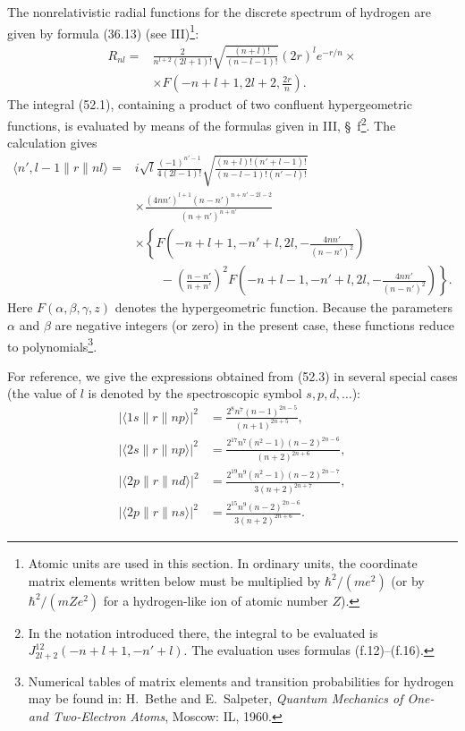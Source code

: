 The nonrelativistic radial functions for the discrete spectrum of hydrogen are given by formula (36.13) (see III)\footnote{Atomic units are used in this section. In ordinary units, the coordinate matrix elements written below must be multiplied by $\hbar^2/(me^2)$ (or by $\hbar^2/(mZe^2)$ for a hydrogen-like ion of atomic number $Z$).}:
\begin{equation}
\begin{aligned}
R_{nl}={}&\frac2{n^{l+2}(2l+1)!}
\sqrt{\frac{(n+l)!}{(n-l-1)!}}(2r)^l e^{-r/n}\mathbin{\times}\\
&\mathbin{\times}F\left(-n+l+1,2l+2,\frac{2r}{n}\right).
\end{aligned}
\tag{52.2}
\end{equation}
The integral (52.1), containing a product of two confluent hypergeometric functions, is evaluated by means of the formulas given in III, \S~f\footnote{In the notation introduced there, the integral to be evaluated is $J_{2l+2}^{12}(-n+l+1,-n'+l)$. The evaluation uses formulas (f.12)--(f.16).}. The calculation gives
\begin{equation}
\begin{aligned}
\langle n',l-1\|r\|nl\rangle
={}&i\sqrt l\frac{(-1)^{n'-1}}{4(2l-1)!}
\sqrt{\frac{(n+l)!(n'+l-1)!}{(n-l-1)!(n'-l)!}}\\
&\times\frac{(4nn')^{l+1}(n-n')^{n+n'-2l-2}}{(n+n')^{n+n'}}\\
&\times\left\{
F\left(-n+l+1,-n'+l,2l,-\frac{4nn'}{(n-n')^2}\right)\right.\\
&\left.\qquad-\left(\frac{n-n'}{n+n'}\right)^2
F\left(-n+l-1,-n'+l,2l,-\frac{4nn'}{(n-n')^2}\right)
\right\}.
\end{aligned}
\tag{52.3}
\end{equation}
Here $F(\alpha,\beta,\gamma,z)$ denotes the hypergeometric function. Because the parameters $\alpha$ and $\beta$ are negative integers (or zero) in the present case, these functions reduce to polynomials\footnote{Numerical tables of matrix elements and transition probabilities for hydrogen may be found in: H.~Bethe and E.~Salpeter, \emph{Quantum Mechanics of One- and Two-Electron Atoms}, Moscow: IL, 1960.}.

For reference, we give the expressions obtained from (52.3) in several special cases (the value of $l$ is denoted by the spectroscopic symbol $s,p,d,\ldots$):
\begin{equation}
\begin{aligned}
|\langle1s\|r\|np\rangle|^2&=\frac{2^8n^7(n-1)^{2n-5}}{(n+1)^{2n+5}},\\
|\langle2s\|r\|np\rangle|^2&=\frac{2^{17}n^7(n^2-1)(n-2)^{2n-6}}{(n+2)^{2n+6}},\\
|\langle2p\|r\|nd\rangle|^2&=\frac{2^{19}n^9(n^2-1)(n-2)^{2n-7}}{3(n+2)^{2n+7}},\\
|\langle2p\|r\|ns\rangle|^2&=\frac{2^{15}n^9(n-2)^{2n-6}}{3(n+2)^{2n+6}}.
\end{aligned}
\tag{52.4}
\end{equation}

